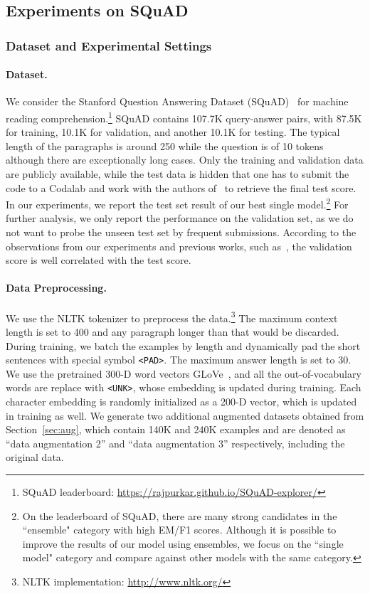 \documentclass{article} \usepackage{iclr2018_conference,times}
\begin{document}
\subsection{Experiments on SQuAD}
\subsubsection{Dataset and Experimental Settings}
\paragraph{Dataset.} We consider the Stanford Question Answering Dataset (SQuAD)~\citep{RajpurkarZLL16} for machine reading comprehension.\footnote{SQuAD leaderboard: \url{https://rajpurkar.github.io/SQuAD-explorer/}} 
SQuAD contains 107.7K query-answer pairs, with 87.5K for training, 10.1K for validation, and another 10.1K for testing. The typical length of the paragraphs is around 250 while the question is of 10 tokens although there are exceptionally long cases. Only the training and validation data are publicly available, while the test data is hidden that one has to submit the code to a Codalab and work with the authors of~\citep{RajpurkarZLL16} to retrieve the final test score. In our experiments, we report the test set result of our best single model.\footnote{On the leaderboard of SQuAD, there are many strong candidates in the ``ensemble" category with high EM/F1 scores. Although it is possible to improve the results of our model using ensembles, we focus on the ``single model" category and compare against other models with the same category.} For further analysis, we only report the performance on the validation set, as we do not want to probe the unseen test set by frequent submissions. 
According to the observations from our experiments and previous works, such as~\citep{SeoKFH16,XiongZS16,WangYWCZ17,ChenFWB17}, the validation score is well correlated with the test score. 


\paragraph{Data Preprocessing.}
We use the NLTK tokenizer to preprocess the data.\footnote{NLTK implementation: \url{http://www.nltk.org/}} The maximum context length is set to 400 and any paragraph longer than that would be discarded. During training, we batch the examples by length and dynamically pad the short sentences with special symbol \texttt{<PAD>}. The maximum answer length is set to 30.
We use the pretrained 300-D word vectors GLoVe~\citep{pennington2014glove}, and all the out-of-vocabulary words are replace with \texttt{<UNK>}, whose embedding is updated during training. Each character embedding is randomly initialized as a 200-D vector, which is updated in training as well.
We generate two additional augmented datasets obtained from Section~\ref{sec:aug}, which contain 140K and 240K examples and are denoted as ``data augmentation  2'' and ``data augmentation  3'' respectively, including the original data.
 
\end{document}
